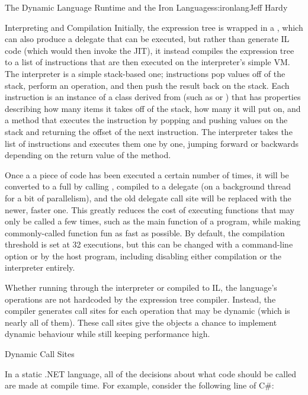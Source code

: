 \begin{aosachapter}{The Dynamic Language Runtime and the Iron Languages}{s:ironlang}{Jeff Hardy}
\begin{aosasect1}{Interpreting and Compilation}
Initially, the expression tree is wrapped in a , which can also produce a delegate that can be executed, but rather than generate IL code (which would then invoke the JIT), it instead compiles the expression tree to a list of instructions that are then executed on the interpreter's simple VM. The interpreter is a simple stack-based one; instructions pop values off of the stack, perform an operation, and then push the result back on the stack. Each instruction is an instance of a class derived from  (such as  or ) that has properties describing how many items it takes off of the stack, how many it will put on, and a  method that executes the instruction by popping and pushing values on the stack and returning the offset of the next instruction. The interpreter takes the list of instructions and executes them one by one, jumping forward or backwards depending on the return value of the  method.

Once a a piece of code has been executed a certain number of times, it will be converted to a full  by calling , compiled to a  delegate (on a background thread for a bit of parallelism), and the old delegate call site will be replaced with the newer, faster one. This greatly reduces the cost of executing functions that may only be called a few times, such as the main function of a program, while making commonly-called function fun as fast as possible. By default, the compilation threshold is set at 32 executions, but this can be changed with a command-line option or by the host program, including disabling either compilation or the interpreter entirely.

Whether running through the interpreter or compiled to IL, the language's operations are not hardcoded by the expression tree compiler. Instead, the compiler generates call sites for each operation that may be dynamic (which is nearly all of them). These call sites give the objects a chance to implement dynamic behaviour while still keeping performance high.

\end{aosasect1}

\begin{aosasect1}{Dynamic Call Sites}

In a static .NET language, all of the decisions about what code should be called are made at compile time. For example, consider the following line of C\#:


\end{aosasect1}
\end{aosachapter}

